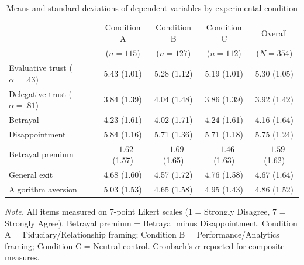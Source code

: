 \begin{table}[htbp]
\centering
\small
\caption{Means and standard deviations of dependent variables by experimental condition}
\label{tab:descriptives}
\begin{tabular}{lcccc}
\toprule
 & Condition A & Condition B & Condition C & Overall \\
 & ($n = 115$) & ($n = 127$) & ($n = 112$) & ($N = 354$) \\
\midrule
Evaluative trust ($\alpha = .43$) & 5.43 (1.01) & 5.28 (1.12) & 5.19 (1.01) & 5.30 (1.05) \\
Delegative trust ($\alpha = .81$) & 3.84 (1.39) & 4.04 (1.48) & 3.86 (1.39) & 3.92 (1.42) \\
Betrayal                          & 4.23 (1.61) & 4.02 (1.71) & 4.24 (1.61) & 4.16 (1.64) \\
Disappointment                    & 5.84 (1.16) & 5.71 (1.36) & 5.71 (1.18) & 5.75 (1.24) \\
Betrayal premium                  & $-1.62$ (1.57) & $-1.69$ (1.65) & $-1.46$ (1.63) & $-1.59$ (1.62) \\
General exit                      & 4.68 (1.60) & 4.57 (1.72) & 4.76 (1.58) & 4.67 (1.64) \\
Algorithm aversion                & 5.03 (1.53) & 4.65 (1.58) & 4.95 (1.43) & 4.86 (1.52) \\
\bottomrule
\end{tabular}
\begin{flushleft}
\footnotesize
\textit{Note.} All items measured on 7-point Likert scales (1 = Strongly Disagree, 7 = Strongly Agree). Betrayal premium = Betrayal minus Disappointment. Condition A = Fiduciary/Relationship framing; Condition B = Performance/Analytics framing; Condition C = Neutral control. Cronbach's $\alpha$ reported for composite measures.
\end{flushleft}
\end{table}
